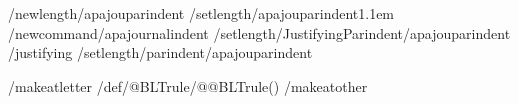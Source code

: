 %
%
%
/newlength{/apajouparindent}
/setlength{/apajouparindent}{1.1em}
/newcommand{/apajournalindent}{%
  /setlength{/JustifyingParindent}{/apajouparindent}%
  /justifying
  /setlength{/parindent}{/apajouparindent}}

%
%
/makeatletter
/def/@BLTrule{/@@BLTrule()}
/makeatother

